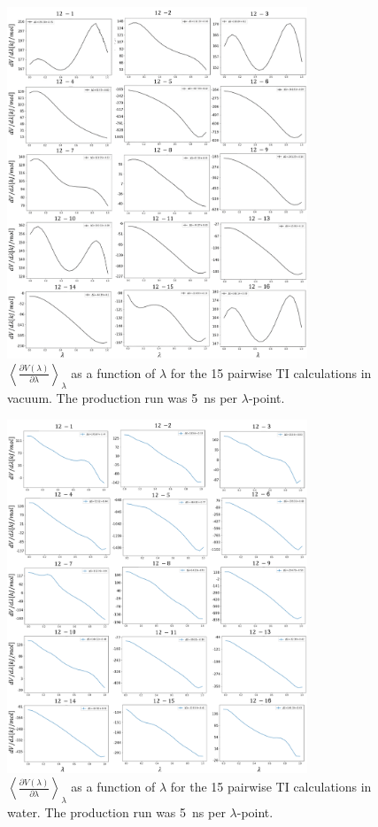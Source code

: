 \begin{figure}[h!]
    \centering
    \includegraphics[width=0.8\textwidth]{fig/SI/dG_convergence/TI_vacuum_lambda_curves.png}
    \caption{$\left< \frac{\partial V(\lambda)}{\partial \lambda} \right>_{\lambda}$ as a function of $\lambda$ for the 15 pairwise TI calculations in vacuum. The production run was 5~ns per $\lambda$-point.}
    \label{SIfig:TI_vacuum_curve}
    \end{figure}

\begin{figure}[h!]
    \centering
    \includegraphics[width=0.8\textwidth]{fig/SI/dG_convergence/TI_water_lambda_curves.png}
    \caption{$\left< \frac{\partial V(\lambda)}{\partial \lambda} \right>_{\lambda}$ as a function of $\lambda$ for the 15 pairwise TI calculations in water. The production run was 5~ns per $\lambda$-point.}
    \label{SIfig:TI_water_curve}
\end{figure}

